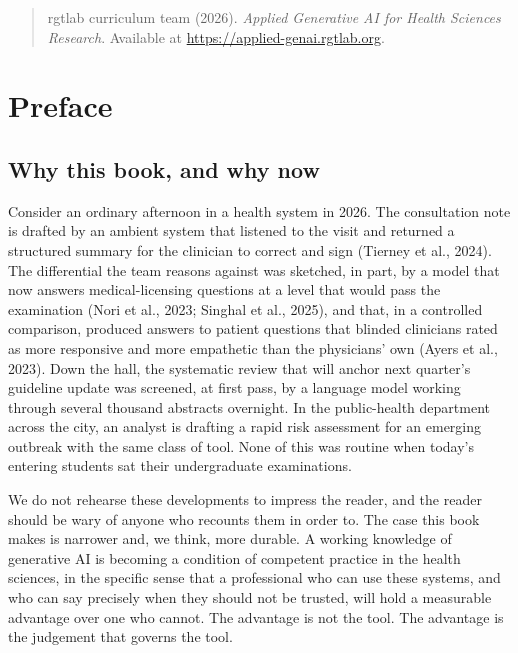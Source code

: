 \documentclass[
  letterpaper,
  11pt]{scrbook}
\begin{document}
\begin{quote}
rgtlab curriculum team (2026). \emph{Applied Generative AI for Health Sciences
Research}. Available at \url{https://applied-genai.rgtlab.org}.
\end{quote}

\clearpage
\tableofcontents
\clearpage


\chapter*{Preface}\label{preface}


\section*{Why this book, and why now}\label{why-this-book-and-why-now}


Consider an ordinary afternoon in a health system in 2026. The
consultation note is drafted by an ambient system that listened to the
visit and returned a structured summary for the clinician to correct and
sign (Tierney et al., 2024). The differential the team reasons against
was sketched, in part, by a model that now answers medical-licensing
questions at a level that would pass the examination (Nori et al., 2023;
Singhal et al., 2025), and that, in a controlled comparison, produced
answers to patient questions that blinded clinicians rated as more
responsive and more empathetic than the physicians' own ({Ayers et al.},
2023). Down the hall, the systematic review that will anchor next
quarter's guideline update was screened, at first pass, by a language
model working through several thousand abstracts overnight. In the
public-health department across the city, an analyst is drafting a rapid
risk assessment for an emerging outbreak with the same class of tool.
None of this was routine when today's entering students sat their
undergraduate examinations.

We do not rehearse these developments to impress the reader, and the
reader should be wary of anyone who recounts them in order to. The case
this book makes is narrower and, we think, more durable. A working
knowledge of generative AI is becoming a condition of competent practice
in the health sciences, in the specific sense that a professional who
can use these systems, and who can say precisely when they should not be
trusted, will hold a measurable advantage over one who cannot. The
advantage is not the tool. The advantage is the judgement that governs
the tool.
\end{document}

